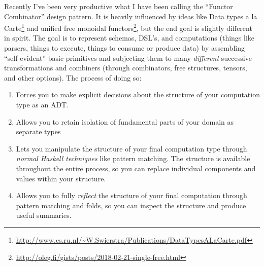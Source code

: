 \documentclass[]{article}
\renewcommand{\href}[2]{#2\footnote{\url{#1}}}
\begin{document}
Recently I've been very productive what I have been calling the ``Functor
Combinator'' design pattern. It is heavily influenced by ideas like
\href{http://www.cs.ru.nl/~W.Swierstra/Publications/DataTypesALaCarte.pdf}{Data
types a la Carte} and
\href{http://oleg.fi/gists/posts/2018-02-21-single-free.html}{unified free
monoidal functors}, but the end goal is slightly different in spirit. The goal
is to represent schemas, DSL's, and computations (things like parsers, things to
execute, things to consume or produce data) by assembling ``self-evident'' basic
primitives and subjecting them to many \emph{different} successive
transformations and combiners (through combinators, free structures, tensors,
and other options). The process of doing so:

\begin{enumerate}
\def\labelenumi{\arabic{enumi}.}
\tightlist
\item
  Forces you to make explicit decisions about the structure of your computation
  type as an ADT.
\item
  Allows you to retain isolation of fundamental parts of your domain as separate
  types
\item
  Lets you manipulate the structure of your final computation type through
  \emph{normal Haskell techniques} like pattern matching. The structure is
  available throughout the entire process, so you can replace individual
  components and values within your structure.
\item
  Allows you to fully \emph{reflect} the structure of your final computation
  through pattern matching and folds, so you can inspect the structure and
  produce useful summaries.
\end{enumerate}
\end{document}

